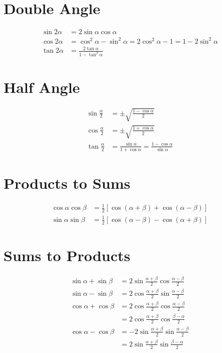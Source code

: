 \documentclass{article}
\begin{document}
        \section{Double Angle}

        \begin{align}
                \sin 2 \alpha &= 2 \sin \alpha \cos \alpha\\
                \cos 2 \alpha &= \cos^2 \alpha - \sin^2 \alpha = 2 \cos^2 \alpha - 1 = 1 - 2 \sin^2 \alpha\\
                \tan 2 \alpha &= \frac{2 \tan \alpha}{1 - \tan^2 \alpha}
        \end{align}

        \section{Half Angle}

        \begin{align}
                \sin \frac{\alpha}{2} &= \pm \sqrt{\frac{1 - \cos \alpha}{2}}\\
                \cos \frac{\alpha}{2} &= \pm \sqrt{\frac{1 + \cos \alpha}{2}}\\
                \tan \frac{\alpha}{2} &= \frac{\sin \alpha}{1 + \cos \alpha} = \frac{1 - \cos \alpha}{\sin \alpha}
        \end{align}

        \section{Products to Sums}

        \begin{align}
                \cos \alpha \cos \beta &= \frac{1}{2} [ \cos(\alpha + \beta) + \cos(\alpha - \beta) ]\\
                \sin \alpha \sin \beta &= \frac{1}{2} [ \cos(\alpha - \beta) - \cos(\alpha + \beta) ]
        \end{align}
        
        \section{Sums to Products}

        \begin{align}
                \sin \alpha + \sin \beta &= 2 \sin \frac{\alpha + \beta}{2} \cos \frac{\alpha - \beta}{2}\\
                \sin \alpha - \sin \beta &= 2 \cos \frac{\alpha + \beta}{2} \sin \frac{\alpha - \beta}{2}\\
                \cos \alpha + \cos \beta &= 2 \cos \frac{\alpha + \beta}{2} \cos \frac{\alpha - \beta}{2}\\
                                         &= 2 \cos \frac{\alpha + \beta}{2} \cos \frac{\beta - \alpha}{2}\\
                \cos \alpha - \cos \beta &= -2 \sin \frac{\alpha + \beta}{2} \sin \frac{\alpha - \beta}{2}\\
                                         &= 2 \sin \frac{\alpha + \beta}{2} \sin \frac{\beta - \alpha}{2}
        \end{align}
\end{document}
